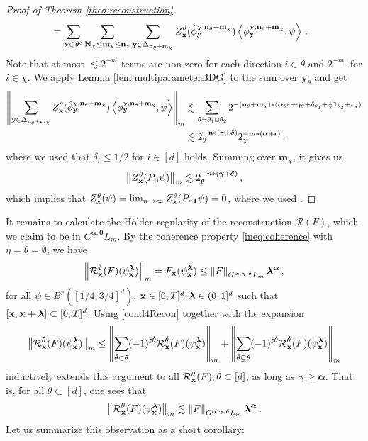 \documentclass[12pt]{article}
\numberwithin{equation}{section}
\theoremstyle{plain}
\theoremstyle{definition}
\newcommand{\scalar}[1]{\left\langle #1 \right\rangle}
\newcommand{\norm}[1]{\left\Vert #1\right\Vert}
\def\cR{\mathcal{R}}\def\cE{\mathcal{E}}
\def\fm{\mathbf m}\def\fn{\mathbf n}\def\fN{\mathbf N}
\def\fy{\mathbf y}\def\fz{\mathbf z}
\def\falpha{{\boldsymbol\alpha}}
\def\fgamma{{\boldsymbol\gamma}}
\def\fdelta{{\boldsymbol\delta}}
\def\flambda{{\boldsymbol\lambda}}
\def\foo{{\boldsymbol 0}}
\def\fone{{\boldsymbol 1}}
\begin{document}
\begin{proof}[Proof of Theorem \ref{theo:reconstruction}]
\begin{align*}
        &= \sum_{\chi\subset\theta^c}\sum_{\fN_\chi\le \fm_\chi\le \fn_\chi} \sum_{\fy\in\Delta_{\fn_\theta+\fm_\chi}}Z_\fx^\theta(\hat\phi^{\chi,\fn_\theta+\fm_\chi}_\fy)\scalar{\phi^{\chi,\fn_\theta+\fm_\chi}_\fy,\psi}\,.
    \end{align*}
    Note that at most $\lesssim 2^{-n_i}$ terms are non-zero for each direction $i\in\theta$ and $2^{-m_i}$ for $i\in\chi$. We apply Lemma \ref{lem:multiparameterBDG} to the sum over $\fy_\theta$ and get
    \begin{align*}   \norm{\sum_{\fy\in\Delta_{\fn_\theta+\fm_\chi}}Z_\fx^\theta(\hat\phi^{\chi,\fn_\theta+\fm_\chi}_\fy)\scalar{\phi^{\chi,\fn_\theta+\fm_\chi}_\fy,\psi}}_m &\lesssim \sum_{\theta = \theta_1\sqcup\theta_2} 2^{-(\fn_\theta+\fm_\chi)*(\falpha_{\theta^c} +\fgamma_\theta+\fdelta_{\theta_1} +\frac12\fone_{\theta_2} +r_\chi)} \\
        &\lesssim 2^{-\fn*(\fgamma+\fdelta)}_{\theta}2^{-\fm*(\falpha+\fr)}_{\chi}\,,
    \end{align*}
    where we used that $\delta_i\le 1/2$ for $i\in[d]$ holds. Summing over $\fm_\chi$, it gives us
    \begin{equation*}
        \norm{Z_\fx^\theta(P_\fn\psi)}_m \lesssim 2^{-n*(\fgamma+\fdelta)}_{\theta}\,,
    \end{equation*}
    which implies that $Z^\theta_\fx(\psi) = \lim_{n\to\infty} Z^\theta_\fx(P_{n\fone}\psi) = 0$, where we used \cite[Lemma 62]{kern2021}. 
\end{proof}
It remains to calculate the Hölder regularity of the reconstruction $\cR(F)$, which we claim to be in $C^{\falpha,\foo} L_m$. By the coherence property \eqref{ineq:coherence} with $\eta =\theta=\emptyset$, we have
\[
    \norm{\cR^\emptyset_\fx(F)(\psi_\fx^\flambda)}_m = F_\fx(\psi_\fx^\flambda)\le \norm{F}_{G^{\falpha,\fgamma,\fdelta}L_m}\flambda^\falpha\,,
\]
for all $\psi\in B^r([1/4,3/4]^d)$, $\fx\in[0,T]^d,\flambda\in(0,1]^d$ such that $[\fx,\fx+\flambda]\subset[0,T]^d$. Using \eqref{cond4Recon} together with the expansion
%
\begin{equation}\label{ineq:expansionfTheta}
\norm{\mathcal{R}^{\theta}_\fx(F)(\psi_\fx^\flambda)}_m \le \norm{\sum_{\hat\theta\subset\theta}(-1)^{\sharp{\hat\theta}} \mathcal{R}^{\hat\theta}_\fx(F)(\psi^{\flambda}_\fx)}_m + \norm{\sum_{\hat\theta\subsetneq\theta}(-1)^{\sharp{\hat\theta}} \mathcal{R}^{\hat\theta}_\fx(F)(\psi^{\flambda}_\fx)}_m
\end{equation}
%
inductively extends this argument to all $\cR^\theta_\fx(F), \theta\subset[d]$, as long as $\fgamma\ge\falpha$. That is, for all $\theta\subset[d]$, one sees that
\[
    \norm{\cR^\theta_\fx(F)(\psi_\fx^\flambda)}_m \lesssim \norm{F}_{G^{\falpha,\fgamma,\fdelta}L_m}\flambda^\falpha\,.
\]
Let us summarize this observation as a short corollary:
\end{document}
